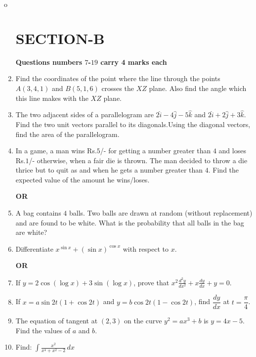 o\documentclass[a4paper,12pt]{article}
\begin{document}
\begin{enumerate}[label=\textbf{\arabic*.}]
\begin{center}
	\section*{\large \textbf{SECTION-B}}
	\textbf{Questions numbers $7$-$19$ carry 4 marks each}
\end{center}
	\vspace{1em}
	\item Find the coordinates of the point where the line through the points $A(3, 4, 1)$ and $B(5, 1, 6)$ crosses the $XZ$ plane. Also find the angle which this line makes with the $XZ$ plane.
	\vspace{0.5em}
	\item The two adjacent sides of a parallelogram are $2\hat{i} - 4\hat{j} - 5\hat{k}$ and $2\hat{i} + 2\hat{j} + 3\hat{k}$. Find the two unit vectors parallel to its diagonals.Using the diagonal vectors, find the area of the parallelogram.
	\vspace{0.5em}
	\item In a game, a man wins Rs.$5$/- for getting a number greater than $4$ and loses Rs.$1$/- otherwise, when a fair die is thrown. The man decided to throw a die thrice but to quit as and when he gets a number greater than $4$. Find the expected value of the amount he wins/loses.
\begin{center}
    \textbf{OR} 
\end{center}
\item[] A bag contains $4$ balls. Two balls are drawn at random (without replacement) and are found to be white. What is the probability that all balls in the bag are white?
	\vspace{0.5em}
	\item Differentiate $x^{\sin x} + (\sin x)^{\cos x}$ with respect to $x$.
\begin{center}
\textbf{OR}
\end{center}
\item[] If $y = 2 \cos(\log x) + 3 \sin(\log x)$, prove that $x^2 \frac{d^2 y}{dx^2} + x \frac{dy}{dx} + y = 0.$
	\vspace{0.5em}
	\item If $x = a \sin 2t(1 + \cos 2t)$ and $y = b \cos 2t(1 - \cos 2t)$,  find $\dfrac{dy}{dx}$ at $t = \dfrac{\pi}{4}$.
	\vspace{0.5em}
	\item The equation of tangent at $(2, 3)$ on the curve $y^2 = ax^3 + b$ is $y = 4x - 5$. Find the values of $a$ and $b$.
	\vspace{0.5em}
	\item Find: $\int \frac{x^2}{x^4 + x^2 - 2} \, dx$
\end{enumerate}
\end{document}
